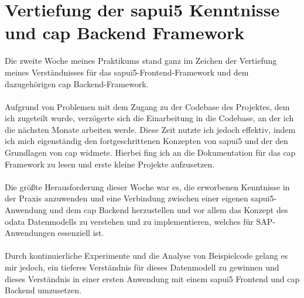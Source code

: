 \section{Vertiefung der \gls{sapui5} Kenntnisse und \gls{cap} Backend Framework}
Die zweite Woche meines Praktikums stand ganz im Zeichen der Vertiefung meines Verständnisses für das \gls{sapui5}-Frontend-Framework und dem dazugehörigen \gls{cap} Backend-Framework. \\\\
Aufgrund von Problemen mit dem Zugang zu der Codebase des Projektes, dem ich zugeteilt wurde, verzögerte sich die Einarbeitung in die Codebase, an der ich die nächsten Monate arbeiten werde. Diese Zeit nutzte ich jedoch effektiv, indem ich mich eigenständig den fortgeschrittenen Konzepten von \gls{sapui5} und der den Grundlagen von \gls{cap} widmete. Hierbei fing ich an die Dokumentation für das \gls{cap} Framework zu lesen und erste kleine Projekte aufzusetzen. \\\\
Die größte Herausforderung dieser Woche war es, die erworbenen Kenntnisse in der Praxis anzuwenden und eine Verbindung zwischen einer eigenen \gls{sapui5}-Anwendung und dem \gls{cap} Backend herzustellen und vor allem das Konzept des \gls{odata} Datenmodells zu verstehen und zu implementieren, welches für SAP-Anwendungen essenziell ist. \\\\
Durch kontinuierliche Experimente und die Analyse von Beispielcode gelang es mir jedoch, ein tieferes Verständnis für dieses Datenmodell zu gewinnen und dieses Verständnis in einer ersten Anwendung mit einem \gls{sapui5} Frontend und \gls{cap} Backend umzusetzen. \\\\

